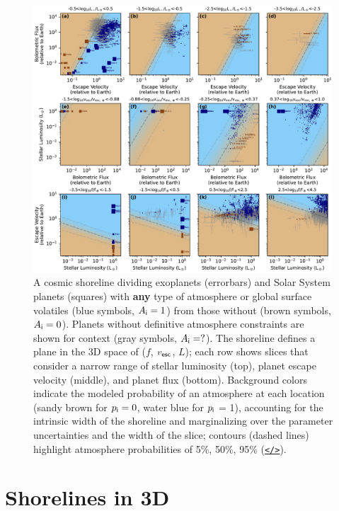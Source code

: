 \documentclass[modern,linenumbers,trackchanges]{aastex7}
\begin{document}
\begin{figure}[ht!]
\includegraphics[width=\textwidth]{figures/grid-of-shorelines-any.pdf}
\caption{A cosmic shoreline dividing exoplanets (errorbars) and Solar System planets (squares) with {\bf any} type of atmosphere or global surface volatiles (blue symbols, $A_{\sf{i}}=1$) from those without (brown symbols, $A_{\sf{i}}=0$). Planets without definitive atmosphere constraints are shown for context (gray symbols, $A_{\sf{i}}=?$). The shoreline defines a plane in the 3D space of ($f$, $v_{\sf esc}$, $L$); each row shows slices that consider a narrow range of stellar luminosity (top), planet escape velocity (middle), and planet flux (bottom). Background colors indicate the modeled probability of an atmosphere at each location (sandy brown for $p_{\sf i} = 0$, water blue for $p_{\sf i}$ = 1), accounting for the intrinsic width of the shoreline and marginalizing over the parameter uncertainties and the width of the slice; contours (dashed lines) highlight atmosphere probabilities of 5\%, 50\%, 95\% (\href{https://github.com/zkbt/shoreline/blob/main/notebooks/plot-shorelines.ipynb}{\texttt{</>}}).}
\label{f:shoreline-any}
\end{figure}


\section{Shorelines in 3D}
\label{s:shorelines}
\end{document}
